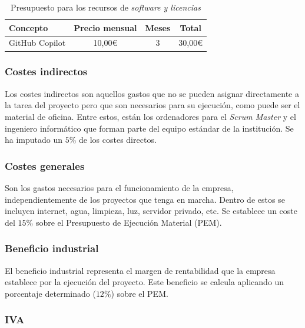 \documentclass[12pt,a4paper,onecolumn,oneside]{report}
\begin{document}
\begin{table}[H]
\caption{Presupuesto para los recursos de \textit{software y licencias}}
\label{tab:presupuesto_hardware}
\centering
\renewcommand{\arraystretch}{1.2}
\begin{tabular}{lccc}
\hline
\textbf{Concepto} & \textbf{Precio mensual} & \textbf{Meses} & \textbf{Total} \\
\hline
GitHub Copilot & 10,00\euro{} & 3 & 30,00\euro{} \\

\hline
\end{tabular}
\end{table}

\subsubsection{Costes indirectos}

Los costes indirectos son aquellos gastos que no se pueden asignar directamente a la tarea
del proyecto pero que son necesarios para su ejecución, como puede ser el 
material de oficina. Entre estos, están los ordenadores para el \textit{Scrum Master} y el ingeniero informático que forman parte
del equipo estándar de la institución. Se ha imputado un $5\%$ de los costes directos.

\subsubsection{Costes generales}

Son los gastos necesarios para el funcionamiento de la empresa, independientemente de los proyectos que tenga en marcha. Dentro de estos se incluyen internet, agua, limpieza, luz, servidor privado, etc.
Se establece un coste del $15\%$ sobre el Presupuesto de Ejecución Material (PEM).

\subsubsection{Beneficio industrial}

El beneficio industrial representa el margen de rentabilidad que la empresa establece por la ejecución del proyecto.
Este beneficio se calcula aplicando un porcentaje determinado ($12\%$) sobre el PEM.

\subsubsection{IVA}
\end{document}
